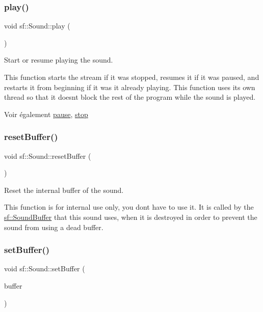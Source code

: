 \subsubsection{\texorpdfstring{play()}{play()}}
{\footnotesize\ttfamily void sf\+::\+Sound\+::play (\begin{DoxyParamCaption}{ }\end{DoxyParamCaption})}



Start or resume playing the sound. 

This function starts the stream if it was stopped, resumes it if it was paused, and restarts it from beginning if it was it already playing. This function uses its own thread so that it doesn\textquotesingle{}t block the rest of the program while the sound is played.

\begin{DoxySeeAlso}{Voir également}
\hyperlink{classsf_1_1Sound_a5eeb25815bfa8cdc4a6cc000b7b19ad5}{pause}, \hyperlink{classsf_1_1Sound_aa9c91c34f7c6d344d5ee9b997511f754}{stop} 
\end{DoxySeeAlso}
\mbox{\label{classsf_1_1Sound_acb7289d45e06fb76b8292ac84beb82a7}} 
\subsubsection{\texorpdfstring{reset\+Buffer()}{resetBuffer()}}
{\footnotesize\ttfamily void sf\+::\+Sound\+::reset\+Buffer (\begin{DoxyParamCaption}{ }\end{DoxyParamCaption})}



Reset the internal buffer of the sound. 

This function is for internal use only, you don\textquotesingle{}t have to use it. It is called by the \hyperlink{classsf_1_1SoundBuffer}{sf\+::\+Sound\+Buffer} that this sound uses, when it is destroyed in order to prevent the sound from using a dead buffer. \mbox{\label{classsf_1_1Sound_a8b395e9713d0efa48a18628c8ec1972e}} 
\subsubsection{\texorpdfstring{set\+Buffer()}{setBuffer()}}
{\footnotesize\ttfamily void sf\+::\+Sound\+::set\+Buffer (\begin{DoxyParamCaption}\item[{const \hyperlink{classsf_1_1SoundBuffer}{Sound\+Buffer} \&}]{buffer }\end{DoxyParamCaption})}



